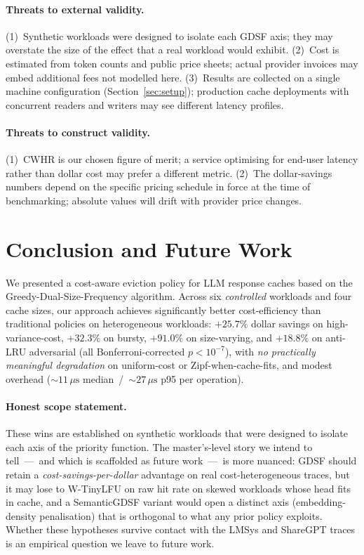 \documentclass[sigconf, nonacm, review=false, screen=true]{acmart}
\begin{document}
\paragraph{Threats to external validity.}
(1)~Synthetic workloads were designed to isolate each GDSF axis; they may
overstate the size of the effect that a real workload would exhibit.
(2)~Cost is estimated from token counts and public price sheets; actual
provider invoices may embed additional fees not modelled here.
(3)~Results are collected on a single machine configuration
(Section~\ref{sec:setup}); production cache deployments with concurrent
readers and writers may see different latency profiles.

\paragraph{Threats to construct validity.}
(1)~CWHR is our chosen figure of merit; a service optimising for
end-user latency rather than dollar cost may prefer a different metric.
(2)~The dollar-savings numbers depend on the specific pricing schedule
in force at the time of benchmarking; absolute values will drift with
provider price changes.

\section{Conclusion and Future Work}
\label{sec:conclude}

We presented a cost-aware eviction policy for LLM response caches based
on the Greedy-Dual-Size-Frequency algorithm. Across six \emph{controlled}
workloads and four cache sizes, our approach achieves significantly
better cost-efficiency than traditional policies on heterogeneous
workloads: \textbf{$+25.7\%$} dollar savings on high-variance-cost,
\textbf{$+32.3\%$} on bursty, \textbf{$+91.0\%$} on size-varying, and
\textbf{$+18.8\%$} on anti-LRU adversarial (all Bonferroni-corrected
$p<10^{-7}$), with \emph{no practically meaningful degradation} on
uniform-cost or Zipf-when-cache-fits, and modest overhead
($\sim 11\,\mu\text{s}$ median~/~$\sim 27\,\mu\text{s}$ p95 per operation).

\paragraph{Honest scope statement.}
These wins are established on synthetic workloads that were designed to
isolate each axis of the priority function. The master's-level story we
intend to tell~---~and which is scaffolded as future work~---~is more
nuanced: GDSF should retain a \emph{cost-savings-per-dollar} advantage
on real cost-heterogeneous traces, but it may lose to W-TinyLFU on raw
hit rate on skewed workloads whose head fits in cache, and a
SemanticGDSF variant would open a distinct axis (embedding-density
penalisation) that is orthogonal to what any prior policy exploits.
Whether these hypotheses survive contact with the LMSys and ShareGPT
traces is an empirical question we leave to future work.
\end{document}
